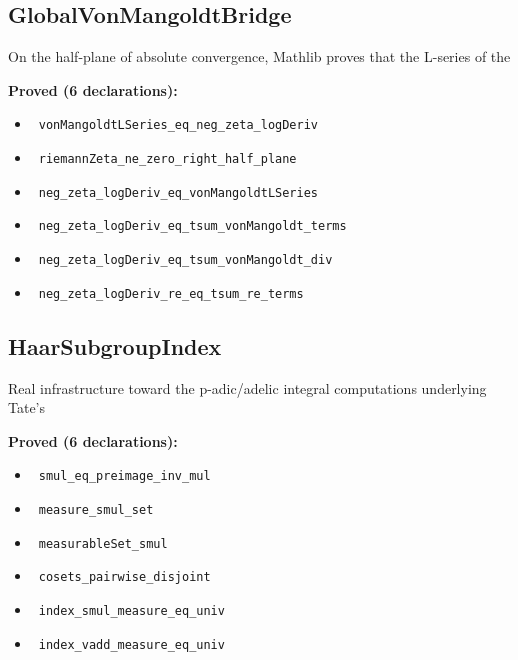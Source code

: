 \documentclass{report}
\theoremstyle{definition}
\begin{document}
\subsection{GlobalVonMangoldtBridge}
On the half-plane of absolute convergence, Mathlib proves that the L-series of the

\noindent\textbf{Proved (6 declarations):}
\begin{itemize}
  \item {}\leanok\ \texttt{vonMangoldtLSeries\_eq\_neg\_zeta\_logDeriv}
  \item {}\leanok\ \texttt{riemannZeta\_ne\_zero\_right\_half\_plane}
  \item {}\leanok\ \texttt{neg\_zeta\_logDeriv\_eq\_vonMangoldtLSeries}
  \item {}\leanok\ \texttt{neg\_zeta\_logDeriv\_eq\_tsum\_vonMangoldt\_terms}
  \item {}\leanok\ \texttt{neg\_zeta\_logDeriv\_eq\_tsum\_vonMangoldt\_div}
  \item {}\leanok\ \texttt{neg\_zeta\_logDeriv\_re\_eq\_tsum\_re\_terms}
\end{itemize}

\subsection{HaarSubgroupIndex}
Real infrastructure toward the p-adic/adelic integral computations underlying Tate's

\noindent\textbf{Proved (6 declarations):}
\begin{itemize}
  \item {}\leanok\ \texttt{smul\_eq\_preimage\_inv\_mul}
  \item {}\leanok\ \texttt{measure\_smul\_set}
  \item {}\leanok\ \texttt{measurableSet\_smul}
  \item {}\leanok\ \texttt{cosets\_pairwise\_disjoint}
  \item {}\leanok\ \texttt{index\_smul\_measure\_eq\_univ}
  \item {}\leanok\ \texttt{index\_vadd\_measure\_eq\_univ}
\end{itemize}
\end{document}
